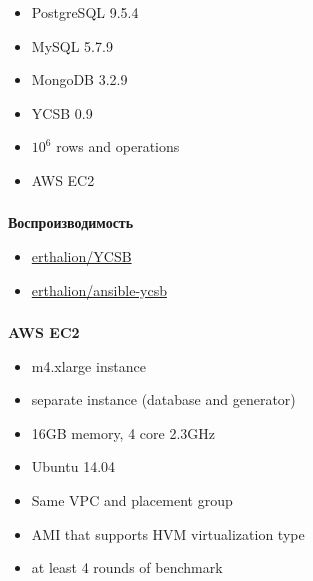 \documentclass[usenames,dvipsnames, 18pt, compress, aspectratio=169]{beamer}
\begin{document}
\begin{frame}
    \frametitle{}
    \begin{center}
        \begin{itemize}[label={}]
            \item PostgreSQL 9.5.4
            \item MySQL 5.7.9
            \item MongoDB 3.2.9
            \item YCSB 0.9
            \item $10^6$ rows and operations
            \item AWS EC2
        \end{itemize}
    \end{center}
\end{frame}

\begin{frame}
    \frametitle{}
    \begin{center}
        \textbf{Воспроизводимость}
        \begin{itemize}[label={}]
            \item \href{https://github.com/erthalion/YCSB}{erthalion/YCSB}
            \item \href{https://github.com/erthalion/ansible-ycsb}{erthalion/ansible-ycsb}
        \end{itemize}
    \end{center}
\end{frame}

\begin{frame}
    \frametitle{}
    \begin{center}
        \textbf{AWS EC2}
        \begin{itemize}[label={}]
            \item m4.xlarge instance
            \item separate instance (database and generator)
            \item 16GB memory, 4 core 2.3GHz
            \item Ubuntu 14.04
            \item Same VPC and placement group
            \item AMI that supports HVM virtualization type
            \item at least 4 rounds of benchmark
        \end{itemize}
    \end{center}
\end{frame}
\end{document}
